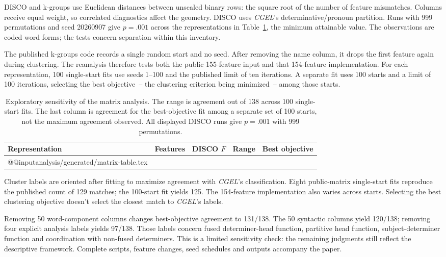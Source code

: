 \documentclass[12pt]{article}
\makeatletter
\newcommand{\tablebody}[1]{\csname @@input\endcsname #1 }
\makeatother
\begin{document}
DISCO and k-groups use Euclidean distances between unscaled binary rows: the square root of the number of feature mismatches. Columns receive equal weight, so correlated diagnostics affect the geometry. DISCO uses \textit{CGEL}'s determinative/pronoun partition. Runs with 999 permutations and seed 20260907 give $p=.001$ across the representations in Table~\ref{tab:matrix}, the minimum attainable value. The observations are coded word forms; the tests concern separation within this inventory.

The published k-groups code records a single random start and no seed. After removing the name column, it drops the first feature again during clustering. The reanalysis therefore tests both the public 155-feature input and that 154-feature implementation. For each representation, 100 single-start fits use seeds 1--100 and the published limit of ten iterations. A separate fit uses 100 starts and a limit of 100 iterations, selecting the best objective~-- the clustering criterion being minimized~-- among those starts.

\begin{table}[htbp]
\centering\small
\caption{Exploratory sensitivity of the matrix analysis. The range is agreement out of 138 across 100 single-start fits. The last column is agreement for the best-objective fit among a separate set of 100 starts, not the maximum agreement observed. All displayed DISCO runs give $p=.001$ with 999 permutations.}\label{tab:matrix}
\begin{tabular}{>{\raggedright\arraybackslash}p{5.1cm}rrrr}
\toprule
Representation & Features & DISCO $F$ & Range & Best objective \\
\midrule
\tablebody{analysis/generated/matrix-table.tex}
\bottomrule
\end{tabular}
\end{table}

Cluster labels are oriented after fitting to maximize agreement with \textit{CGEL}'s classification. Eight public-matrix single-start fits reproduce the published count of 129 matches; the 100-start fit yields 125. The 154-feature implementation also varies across starts. Selecting the best clustering objective doesn't select the closest match to \textit{CGEL}'s labels.

Removing 50 word-component columns changes best-objective agreement to 131/138. The 50 syntactic columns yield 120/138; removing four explicit analysis labels yields 97/138. Those labels concern fused determiner-head function, partitive head function, subject-determiner function and coordination with non-fused determiners. This is a limited sensitivity check: the remaining judgments still reflect the descriptive framework. Complete scripts, feature changes, seed schedules and outputs accompany the paper.

\clearpage
\printbibliography
\end{document}
